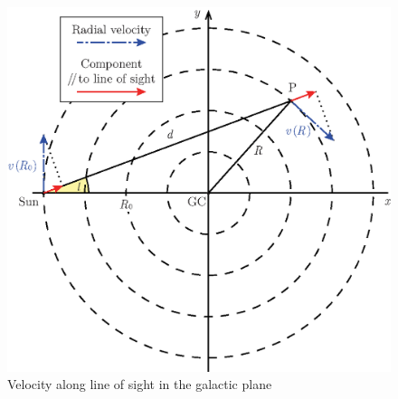 \documentclass[a4paper, titlepage, oneside]{article}
\begin{document}
\begin{figure}[h]
  \centering
  \includegraphics[width=13cm]{figures/doppler-shift}
  \caption{Velocity along line of sight in the galactic plane}
  \label{fig:doppler}
\end{figure}
\end{document}
